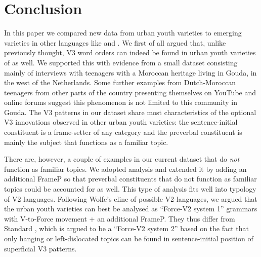 \documentclass[output=paper]{langsci/langscibook}
\begin{document}
\section{Conclusion}
\label{sec:con}


\noindent In this paper we compared new data from  urban youth varieties
to emerging varieties in other  languages like  and . We
first of all argued that, unlike previously thought, V3 word orders can indeed
be found in urban youth varieties of  as well. We supported this with
evidence from a small dataset consisting mainly of interviews with teenagers
with a Moroccan heritage living in Gouda, in the west of the Netherlands. Some
further examples from Dutch-Moroccan teenagers from other parts of the country
presenting themselves on YouTube and online forums suggest this phenomenon is
not limited to this community in Gouda. The V3 patterns in our dataset share
most characteristics of the optional V3 innovations observed in other 
urban youth varieties: the sentence-initial constituent is a frame-setter of
any category and the preverbal constituent is mainly the subject that functions
as a familiar topic.

There are, however, a couple of examples in our current dataset that do
\emph{not} function as familiar topics. We adopted 
analysis and extended it by adding an additional FrameP so that preverbal
constituents that do not function as familiar topics could be accounted for as
well. This type of analysis fits well into  typology of V2
languages.  Following Wolfe's cline of possible V2-languages, we argued that
the  urban youth varieties can best be analysed as \enquote{Force-V2
system 1} grammars with V-to-Force movement + an additional FrameP. They thus
differ from Standard , which is argued to be a \enquote{Force-V2 system 2}
based on the fact that only hanging or left-dislocated
topics can be found in sentence-initial position of superficial V3
patterns.

\printchapterglossary{}

\end{document}
